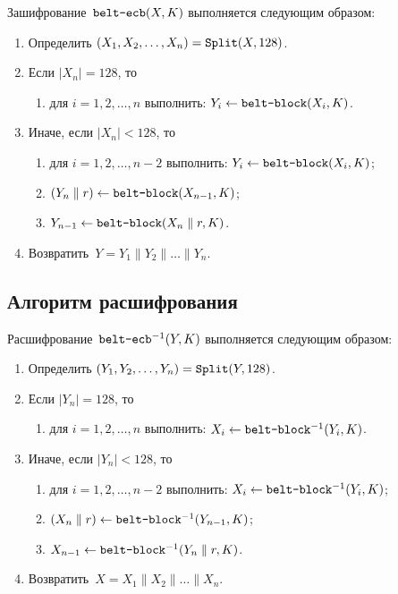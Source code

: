 Зашифрование~$\texttt{belt-ecb}(X,K)$ выполняется следующим образом: 
\begin{enumerate}
\item
Определить $(X_1,X_2,\ldots,X_n)=\mathop{\texttt{Split}}\nolimits(X,128)$.
\item
Если $|X_n|=128$, то
\begin{enumerate}
\item
для $i=1,2,\ldots,n$ выполнить: $Y_i\leftarrow \texttt{belt-block}(X_i,K)$.
\end{enumerate}

\item
Иначе, если $|X_n|<128$, то
\begin{enumerate}
\item
для $i=1,2,\ldots,n-2$ выполнить: $Y_i\leftarrow \texttt{belt-block}(X_i,K)$;

\item
$(Y_n\parallel r)\leftarrow \texttt{belt-block}(X_{n-1},K)$;

\item
$Y_{n-1}\leftarrow \texttt{belt-block}(X_n\parallel r,K)$.
\end{enumerate}

\item
Возвратить~$Y=Y_1\parallel Y_2\parallel\ldots\parallel Y_n$.
\end{enumerate}

\subsection{Алгоритм расшифрования}\label{ECB.Decr}

Расшифрование~$\texttt{belt-ecb}^{-1}(Y,K)$ выполняется следующим образом: 
\begin{enumerate}
\item
Определить $(Y_1,Y_2,\ldots,Y_n)=\mathop{\texttt{Split}}\nolimits(Y,128)$.
\item
Если $|Y_n|=128$, то
\begin{enumerate}
\item
для $i=1,2,\ldots,n$ выполнить: $X_i\leftarrow \texttt{belt-block}^{-1}(Y_i,K)$.
\end{enumerate}
\item
Иначе, если $|Y_n|<128$, то
\begin{enumerate}
\item
для $i=1,2,\ldots,n-2$ 
выполнить: $X_i\leftarrow \texttt{belt-block}^{-1}(Y_i,K)$;
\item
$(X_n\parallel r)\leftarrow \texttt{belt-block}^{-1}(Y_{n-1},K)$;
\item
$X_{n-1}\leftarrow \texttt{belt-block}^{-1}(Y_n\parallel r,K)$.
\end{enumerate}
\item
Возвратить~$X=X_1\parallel X_2\parallel\ldots\parallel X_n$.
\end{enumerate}
